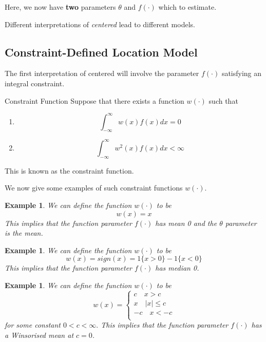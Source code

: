 \documentclass[twoside]{article}
\newtheorem{example}[theorem]{Example}
\begin{document}
Here, we now have \textbf{two} parameters $\theta$ and $f(\cdot)$ which to estimate.

Different interpretations of \textit{centered} lead to different models.
\subsection{Constraint-Defined Location Model}
The first interpretation of centered will involve the parameter $f(\cdot)$ satisfying an integral constraint. 

\begin{definition_exam}{Constraint Function}{} Suppose that there exists a function $w(\cdot)$ such that 
\begin{enumerate}
    \item $$\int_{-\infty}^{\infty}w(x)f(x)dx = 0$$
    \item $$\int_{-\infty}^{\infty}w^2(x)f(x)dx < \infty$$
\end{enumerate}
This is known as the constraint function.
\end{definition_exam}

We now give some examples of such constraint functions $w(\cdot).$

\begin{example} We can define the function $w(\cdot)$ to be 
\begin{equation}
    w(x) = x
\end{equation}
This implies that the function parameter $f(\cdot)$ has mean 0 and the $\theta$ parameter is the mean.
\end{example}

\begin{example} We can define the function $w(\cdot)$ to be 
\begin{equation}
    w(x) = sign(x) = 1\{x > 0\} - 1\{x < 0\}
\end{equation}
This implies that the function parameter $f(\cdot)$ has median 0.
\end{example}

\begin{example} We can define the function $w(\cdot)$ to be 
\begin{equation}
    w(x) = 
    \begin{cases}
        c \quad x > c\\
        x \quad |x| \leq c\\
        -c \quad x < -c\\
    \end{cases}
\end{equation}
for some constant $0 < c < \infty.$ This implies that the function parameter $f(\cdot)$ has a \textit{Winsorised} mean at $c = 0$.
\end{example}
\end{document}
